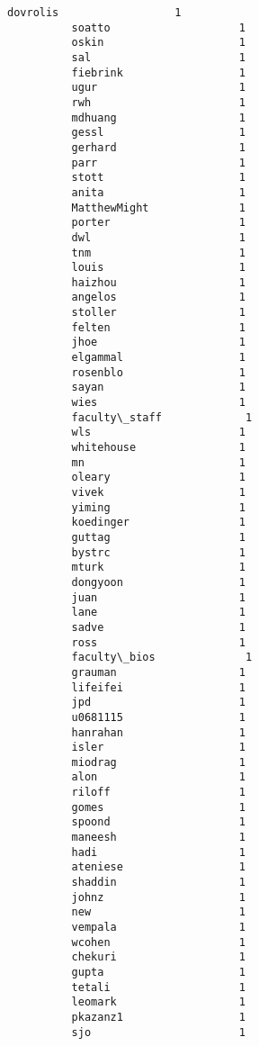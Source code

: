 \documentclass[11pt]{article}
\begin{document}
\begin{Verbatim}[commandchars=\\\{\}]
          dovrolis                  1
          soatto                    1
          oskin                     1
          sal                       1
          fiebrink                  1
          ugur                      1
          rwh                       1
          mdhuang                   1
          gessl                     1
          gerhard                   1
          parr                      1
          stott                     1
          anita                     1
          MatthewMight              1
          porter                    1
          dwl                       1
          tnm                       1
          louis                     1
          haizhou                   1
          angelos                   1
          stoller                   1
          felten                    1
          jhoe                      1
          elgammal                  1
          rosenblo                  1
          sayan                     1
          wies                      1
          faculty\_staff             1
          wls                       1
          whitehouse                1
          mn                        1
          oleary                    1
          vivek                     1
          yiming                    1
          koedinger                 1
          guttag                    1
          bystrc                    1
          mturk                     1
          dongyoon                  1
          juan                      1
          lane                      1
          sadve                     1
          ross                      1
          faculty\_bios              1
          grauman                   1
          lifeifei                  1
          jpd                       1
          u0681115                  1
          hanrahan                  1
          isler                     1
          miodrag                   1
          alon                      1
          riloff                    1
          gomes                     1
          spoond                    1
          maneesh                   1
          hadi                      1
          ateniese                  1
          shaddin                   1
          johnz                     1
          new                       1
          vempala                   1
          wcohen                    1
          chekuri                   1
          gupta                     1
          tetali                    1
          leomark                   1
          pkazanz1                  1
          sjo                       1

\end{Verbatim}
\end{document}
